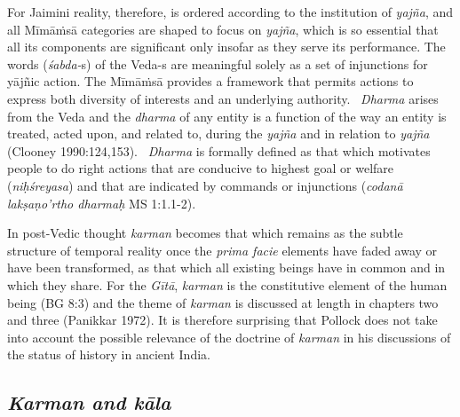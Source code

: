 \vskip 2pt

For Jaimini reality, therefore, is ordered according to the institution of \textit{yajña}, and all Mīmāṁsā categories are shaped to focus on \textit{yajña}, which is so essential that all its components are significant only insofar as they serve its performance. The words (\textit{śabda-}s) of the Veda-s are meaningful solely as a set of injunctions for yājñic action. The Mīmāṁsā provides a framework that permits actions to express both diversity of interests and an underlying authority.  \textit{Dharma} arises from the Veda and the \textit{dharma} of any entity is a function of the way an entity is treated, acted upon, and related to, during the \textit{yajña} and in relation to \textit{yajña} (Clooney 1990:124,153).  \textit{Dharma} is formally defined as that which motivates people to do right actions that are conducive to highest goal or welfare (\textit{niḥśreyasa}) and that are indicated by commands or injunctions (\textit{codanā lakṣaṇo'rtho dharmaḥ} MS 1:1.1-2).

\vskip 2pt

In post-Vedic thought \textit{karman} becomes that which remains as the subtle structure of temporal reality once the \textit{prima facie} elements have faded away or have been transformed, as that which all existing beings have in common and in which they share. For the \textit{Gītā}, \textit{karman} is the constitutive element of the human being (BG 8:3) and the theme of \textit{karman} is discussed at length in chapters two and three (Panikkar 1972). It is therefore surprising that Pollock does not take into account the possible relevance of the doctrine of \textit{karman} in his discussions of the status of history in ancient India.


\subsection*{\textit{Karman and kāla}}

